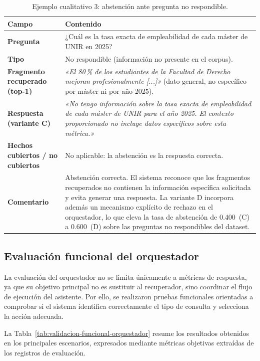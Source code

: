 \begin{table}[H]
\centering\footnotesize
\setlength{\tabcolsep}{5pt}
\begin{tabularx}{\linewidth}{>{\bfseries}p{3.6cm}X}
\toprule
Campo & Contenido \\
\midrule
Pregunta & ¿Cuál es la tasa exacta de empleabilidad de cada máster de UNIR en 2025? \\
\addlinespace
Tipo & No respondible (información no presente en el corpus). \\
\addlinespace
Fragmento recuperado (top-1) & \emph{«El 80\,\% de los estudiantes de la Facultad de Derecho mejoran profesionalmente [...]»} (dato general, no específico por máster ni por año 2025). \\
\addlinespace
Respuesta (variante C) & \emph{«No tengo información sobre la tasa exacta de empleabilidad de cada máster de UNIR para el año 2025. El contexto proporcionado no incluye datos específicos sobre esta métrica.»} \\
\addlinespace
Hechos cubiertos / no cubiertos & No aplicable: la abstención es la respuesta correcta. \\
\addlinespace
Comentario & Abstención correcta. El sistema reconoce que los fragmentos recuperados no contienen la información específica solicitada y evita generar una respuesta. La variante D incorpora además un mecanismo explícito de rechazo en el orquestador, lo que eleva la tasa de abstención de 0.400~(C) a 0.600~(D) sobre las preguntas no respondibles del dataset. \\
\bottomrule
\end{tabularx}
\caption{Ejemplo cualitativo 3: abstención ante pregunta no respondible.}
\label{tab:ejemplo-cualitativo-3}
\end{table}

\subsection{Evaluación funcional del orquestador}\label{sec:evaluacion-funcional-orquestador}

La evaluación del orquestador no se limita únicamente a métricas de respuesta, ya que su objetivo principal no es sustituir al recuperador, sino coordinar el flujo de ejecución del asistente. 
Por ello, se realizaron pruebas funcionales orientadas a comprobar si el sistema identifica correctamente el tipo de consulta y selecciona la acción adecuada.

La Tabla~\ref{tab:validacion-funcional-orquestador} resume los resultados obtenidos en los principales escenarios, expresados mediante métricas objetivas extraídas de los registros de evaluación.


